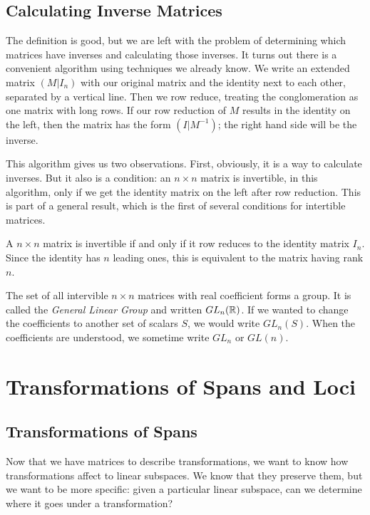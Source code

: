 \documentclass[fleqn]{report}
\begin{document}
\section{Calculating Inverse Matrices}

The definition is good, but we are left with the problem of
determining which matrices have inverses and calculating those
inverses. It turns out there is a convenient algorithm using
techniques we already know. We write an extended matrix
$(M|I_n)$ with our original matrix and the identity next to
each other, separated by a vertical line. Then we row reduce,
treating the conglomeration as one matrix with long rows.
If our row reduction of $M$ results in the identity on the
left, then the matrix has the form $(I|M^{-1})$; the right
hand side will be the inverse.

This algorithm gives us two observations. First, obviously,
it is a way to calculate inverses. But it also is a
condition: an $n \times n$ matrix is invertible, in this
algorithm, only if we get the identity matrix on the left after
row reduction. This is part of a general result, which is the
first of several conditions for intertible matrices.

\begin{prop}
A $n \times n$ matrix is invertible if and only if it row
reduces to the identity matrix $I_n$. Since the identity has
$n$ leading ones, this is equivalent to the matrix having rank
$n$.
\end{prop}

\begin{defn}
The set of all intervible $n \times n$ matrices with real
coefficient forms a group. It is called the \emph{General
Linear Group} and written $GL_n(\mathbb{R})$. If we wanted to change
the coefficients to another set of scalars $S$, we would write
$GL_n(S)$. When the coefficients are understood, we sometime
write $GL_n$ or $GL(n)$.
\end{defn}

\chapter{Transformations of Spans and Loci}
\label{transformations_of_spans}

\section{Transformations of Spans}

Now that we have matrices to describe transformations, we want
to know how transformations affect to linear subspaces. We know
that they preserve them, but we want to be more specific:
given a particular linear subspace, can we determine where it
goes under a transformation?
\end{document}

